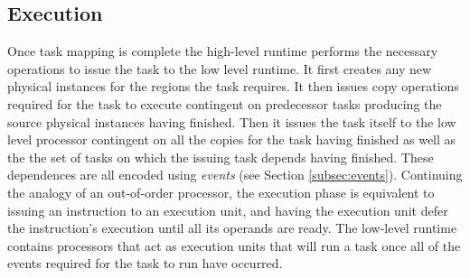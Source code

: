 \subsection{Execution}
\label{subsec:execution}
Once task mapping is complete the high-level runtime performs the necessary operations
to issue the task to the low level runtime.  It first creates any new physical instances
for the regions the task requires.  It then issues copy operations required
for the task to execute contingent on predecessor tasks producing the source physical instances
having finished.  Then it issues the task itself to the low level processor contingent
on all the copies for the task having finished as well as the the set of tasks
on which the issuing task depends having finished.  These dependences are all encoded
using {\em events} (see Section \ref{subsec:events}).  Continuing the analogy of an out-of-order
processor, the execution phase is equivalent to issuing an instruction to an
execution unit, and having the execution unit defer the instruction's execution until all its
operands are ready.  The low-level runtime contains processors that act as execution
units that will run a task once all of the events required for the task to run
have occurred. 



